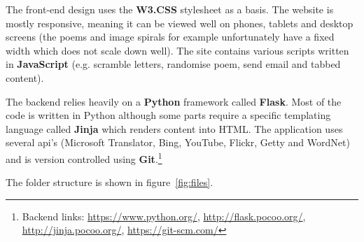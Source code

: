 The front-end design uses the \textbf{W3.CSS} stylesheet as a basis. The website is mostly responsive, meaning it can be viewed well on phones, tablets and desktop screens (the poems and image spirals for example unfortunately have a fixed width which does not scale down well). The site contains various scripts written in \textbf{JavaScript} (e.g. scramble letters, randomise poem, send email and tabbed content).

The backend relies heavily on a \textbf{Python} framework called \textbf{Flask}. Most of the code is written in Python although some parts require a specific templating language called \textbf{Jinja} which renders content into HTML. The application uses several \acs{api}'s (Microsoft Translator, Bing, YouTube, Flickr, Getty and WordNet) and is version controlled using \textbf{Git}.\footnote{Backend links: \url{https://www.python.org/}, \url{http://flask.pocoo.org/}, \url{http://jinja.pocoo.org/}, \url{https://git-scm.com/}}

The folder structure is shown in figure~\ref{fig:files}.

